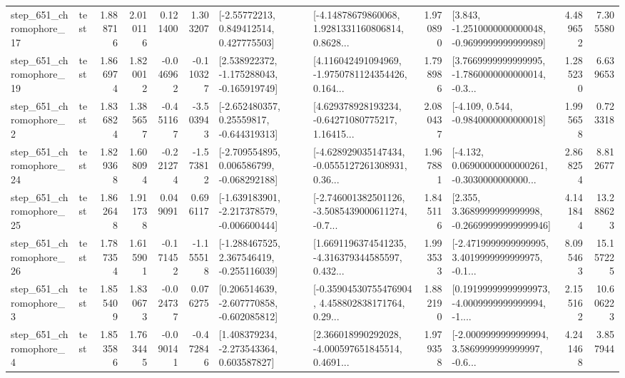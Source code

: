 \begin{tabular}{llrrrrllrlrr}
  step\_651\_chromophore\_17 &      test &      1.888716 &    2.010116 &      0.121400 &  1.303207 &     [-2.55772213, 0.849412514, 0.427775503] &  [-4.14878679860068, 1.9281331160806814, 0.8628... &       1.970890 &  [3.843, -1.2510000000000048, -0.9699999999999989] &            4.489652 &          7.305580 \\
  step\_651\_chromophore\_19 &      test &      1.866974 &    1.820012 &     -0.046962 & -0.110327 &   [2.538922372, -1.175288043, -0.165919749] &  [4.116042491094969, -1.9750781124354426, 0.164... &       1.798986 &  [3.7669999999999995, -1.7860000000000014, -0.3... &            1.285230 &          6.639653 \\
   step\_651\_chromophore\_2 &      test &      1.836824 &    1.385657 &     -0.451167 & -3.503943 &    [-2.652480357, 0.25559817, -0.644319313] &  [4.629378928193234, -0.64271080775217, 1.16415... &       2.080437 &               [-4.109, 0.544, -0.9840000000000018] &            1.995658 &          0.723318 \\
  step\_651\_chromophore\_24 &      test &      1.829368 &    1.608094 &     -0.221274 & -1.573812 &   [-2.709554895, 0.006586799, -0.068292188] &  [-4.628929035147434, -0.0555127261308931, 0.36... &       1.967881 &  [-4.132, 0.06900000000000261, -0.3030000000000... &            2.868254 &          8.812677 \\
  step\_651\_chromophore\_25 &      test &      1.862648 &    1.911738 &      0.049091 &  0.696117 &  [-1.639183901, -2.217378579, -0.006600444] &  [-2.746001382501126, -3.5085439000611274, -0.7... &       1.845116 &  [2.355, 3.3689999999999998, -0.26699999999999946] &            4.141844 &         13.288623 \\
  step\_651\_chromophore\_26 &      test &      1.787354 &    1.615901 &     -0.171452 & -1.155518 &   [-1.288467525, 2.367546419, -0.255116039] &  [1.6691196374541235, -4.316379344585597, 0.432... &       1.993533 &  [-2.4719999999999995, 3.4019999999999975, -0.1... &            8.095463 &         15.157225 \\
   step\_651\_chromophore\_3 &      test &      1.855409 &    1.830673 &     -0.024737 &  0.076275 &   [0.206514639, -2.607770858, -0.602085812] &  [-0.35904530755476904, 4.458802838171764, 0.29... &       1.882190 &  [0.19199999999999973, -4.0009999999999994, -1.... &            2.155162 &         10.606223 \\
   step\_651\_chromophore\_4 &      test &      1.853586 &    1.763445 &     -0.090141 & -0.472846 &    [1.408379234, -2.273543364, 0.603587827] &  [2.366018990292028, -4.000597651845514, 0.4691... &       1.979358 &  [-2.0009999999999994, 3.5869999999999997, -0.6... &            4.241468 &          3.857944 \\

\end{tabular}
